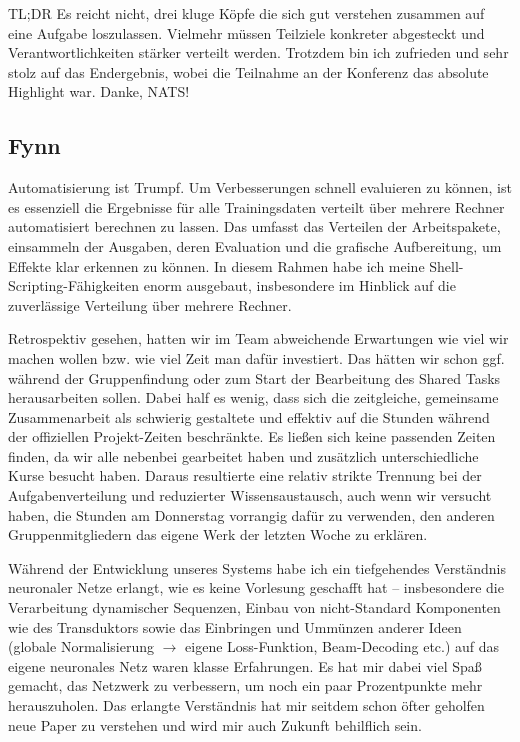 \documentclass[11pt,a4paper]{article}
\begin{document}
TL;DR Es reicht nicht, drei kluge Köpfe die sich gut verstehen zusammen auf eine Aufgabe loszulassen. Vielmehr müssen Teilziele konkreter abgesteckt und Verantwortlichkeiten stärker verteilt werden. Trotzdem bin ich zufrieden und sehr stolz auf das Endergebnis, wobei die Teilnahme an der Konferenz das absolute Highlight war. Danke, NATS!

\subsection{Fynn}
Automatisierung ist Trumpf.
Um Verbesserungen schnell evaluieren zu können, ist es essenziell die Ergebnisse für alle Trainingsdaten verteilt über mehrere Rechner automatisiert berechnen zu lassen.
Das umfasst das Verteilen der Arbeitspakete, einsammeln der Ausgaben, deren Evaluation und die grafische Aufbereitung, um Effekte klar erkennen zu können.
In diesem Rahmen habe ich meine Shell-Scripting-Fähigkeiten enorm ausgebaut, insbesondere im Hinblick auf die zuverlässige Verteilung über mehrere Rechner.

Retrospektiv gesehen, hatten wir im Team abweichende Erwartungen wie viel wir machen wollen bzw. wie viel Zeit man dafür investiert.
Das hätten wir schon ggf. während der Gruppenfindung oder zum Start der Bearbeitung des Shared Tasks herausarbeiten sollen.
Dabei half es wenig, dass sich die zeitgleiche, gemeinsame Zusammenarbeit als schwierig gestaltete und effektiv auf die Stunden während der offiziellen Projekt-Zeiten beschränkte.
Es ließen sich keine passenden Zeiten finden, da wir alle nebenbei gearbeitet haben und zusätzlich unterschiedliche Kurse besucht haben.
Daraus resultierte eine relativ strikte Trennung bei der Aufgabenverteilung und reduzierter Wissensaustausch, auch wenn wir versucht haben, die Stunden am Donnerstag vorrangig dafür zu verwenden, den anderen Gruppenmitgliedern das eigene Werk der letzten Woche zu erklären.

Während der Entwicklung unseres Systems habe ich ein tiefgehendes Verständnis neuronaler Netze erlangt, wie es keine Vorlesung geschafft hat -- insbesondere die Verarbeitung dynamischer Sequenzen, Einbau von nicht-Standard Komponenten wie des Transduktors sowie das Einbringen und Ummünzen anderer Ideen (globale Normalisierung $\to$ eigene Loss-Funktion, Beam-Decoding etc.) auf das eigene neuronales Netz waren klasse Erfahrungen.
Es hat mir dabei viel Spaß gemacht, das Netzwerk zu verbessern, um noch ein paar Prozentpunkte mehr herauszuholen.
Das erlangte Verständnis hat mir seitdem schon öfter geholfen neue Paper zu verstehen und wird mir auch Zukunft behilflich sein.
\end{document}
